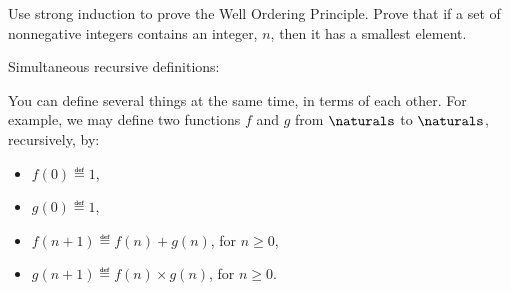 \begin{problems}
\practiceproblems

\classproblems


\homeworkproblems
{}


\begin{editingnotes}
\begin{problem}
Use strong induction to prove the Well Ordering Principle. \hint Prove
that if a set of nonnegative integers contains an integer, $n$, then it
has a smallest element.
\end{problem}
\end{editingnotes}

\begin{editingnotes}

Simultaneous recursive definitions:

  You can define several things at the same time, in terms of each
  other.  For example, we may define two functions $f$ and $g$ from
  $\naturals$ to $\naturals$, recursively, by:
  \begin{itemize}
  \item
    $f(0) \eqdef 1$,
  \item
    $g(0) \eqdef 1$,
  \item
    $f(n+1) \eqdef f(n) + g(n)$, for $n \geq 0$,
  \item
    $g(n+1) \eqdef f(n) \times g(n)$, for $n \geq 0$.
  \end{itemize}

\end{editingnotes}

\begin{editingnotes}


\end{editingnotes}
\end{problems}
